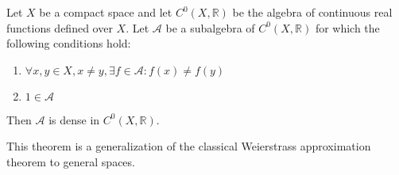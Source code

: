 \documentclass[12pt]{article}
\begin{document}
Let $X$ be a compact space and let $C^0(X,\mathbb{R})$ be the algebra of continuous real functions 
defined over $X$. Let $\mathcal{A}$ be a subalgebra of $C^0(X,\mathbb{R})$ for which the following 
conditions hold:
\begin{enumerate}
\item $\forall x, y \in X, x \ne y, \exists f \in \mathcal{A} : f(x) \neq f(y)$
\item $1 \in \mathcal{A}$
\end{enumerate}
Then $\mathcal{A}$ is dense in $C^0(X,\mathbb{R})$.

This theorem is a generalization of the classical Weierstrass approximation theorem to general spaces.
\end{document}
